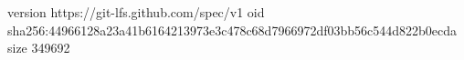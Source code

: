 version https://git-lfs.github.com/spec/v1
oid sha256:44966128a23a41b6164213973e3c478c68d7966972df03bb56c544d822b0ecda
size 349692
